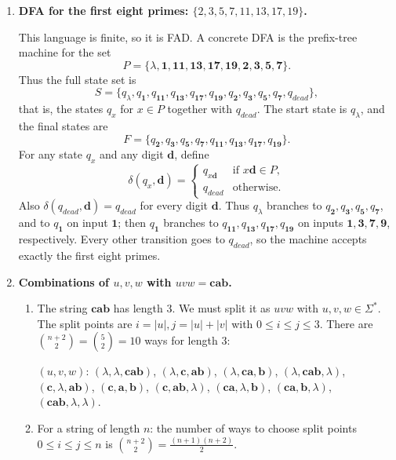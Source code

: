 \documentclass[11pt,openany]{book}
\begin{document}
\begin{enumerate}[{1.}1.]
\item \textbf{DFA for the first eight primes: $\{2,3,5,7,11,13,17,19\}$.}

This language is finite, so it is FAD. A concrete DFA is the prefix-tree machine for the set
\[
P=\{\lambda,\pmb{1},\pmb{11},\pmb{13},\pmb{17},\pmb{19},\pmb{2},\pmb{3},\pmb{5},\pmb{7}\}.
\]
Thus the full state set is
\[
S=\{q_{\lambda},q_{\pmb{1}},q_{\pmb{11}},q_{\pmb{13}},q_{\pmb{17}},q_{\pmb{19}},
q_{\pmb{2}},q_{\pmb{3}},q_{\pmb{5}},q_{\pmb{7}},q_{dead}\},
\]
that is, the states $q_x$ for $x\in P$ together with $q_{dead}$. The start state
is $q_\lambda$, and the final states are
\[
F=\{q_{\pmb{2}},q_{\pmb{3}},q_{\pmb{5}},q_{\pmb{7}},q_{\pmb{11}},q_{\pmb{13}},q_{\pmb{17}},q_{\pmb{19}}\}.
\]
For any state $q_x$ and any digit $\pmb{d}$, define
\[
\delta(q_x,\pmb{d})=
\begin{cases}
q_{x\pmb{d}} & \text{if } x\pmb{d}\in P,\\
q_{dead} & \text{otherwise.}
\end{cases}
\]
Also $\delta(q_{dead},\pmb{d})=q_{dead}$ for every digit $\pmb{d}$. Thus $q_\lambda$ branches to $q_{\pmb{2}},q_{\pmb{3}},q_{\pmb{5}},q_{\pmb{7}}$, and to $q_{\pmb{1}}$ on input $\pmb{1}$; then $q_{\pmb{1}}$ branches to $q_{\pmb{11}},q_{\pmb{13}},q_{\pmb{17}},q_{\pmb{19}}$ on inputs $\pmb{1},\pmb{3},\pmb{7},\pmb{9}$, respectively. Every other transition goes to $q_{dead}$, so the machine accepts exactly the first eight primes.

\item \textbf{Combinations of $u,v,w$ with $uvw = \mathbf{cab}$.}

\begin{enumerate}
\item The string $\mathbf{cab}$ has length 3. We must split it as $uvw$ with $u,v,w\in\Sigma^*$. The split points are $i=|u|,j=|u|+|v|$ with $0\leq i\leq j\leq 3$. There are $\binom{n+2}{2}=\binom{5}{2}=10$ ways for length 3:

$(u,v,w)$: $(\lambda,\lambda,\mathbf{cab})$, $(\lambda,\mathbf{c},\mathbf{ab})$, $(\lambda,\mathbf{ca},\mathbf{b})$, $(\lambda,\mathbf{cab},\lambda)$, $(\mathbf{c},\lambda,\mathbf{ab})$, $(\mathbf{c},\mathbf{a},\mathbf{b})$, $(\mathbf{c},\mathbf{ab},\lambda)$, $(\mathbf{ca},\lambda,\mathbf{b})$, $(\mathbf{ca},\mathbf{b},\lambda)$, $(\mathbf{cab},\lambda,\lambda)$.

\item For a string of length $n$: the number of ways to choose split points $0\leq i\leq j\leq n$ is $\binom{n+2}{2} = \frac{(n+1)(n+2)}{2}$.
\end{enumerate}


\end{enumerate}
\end{document}
